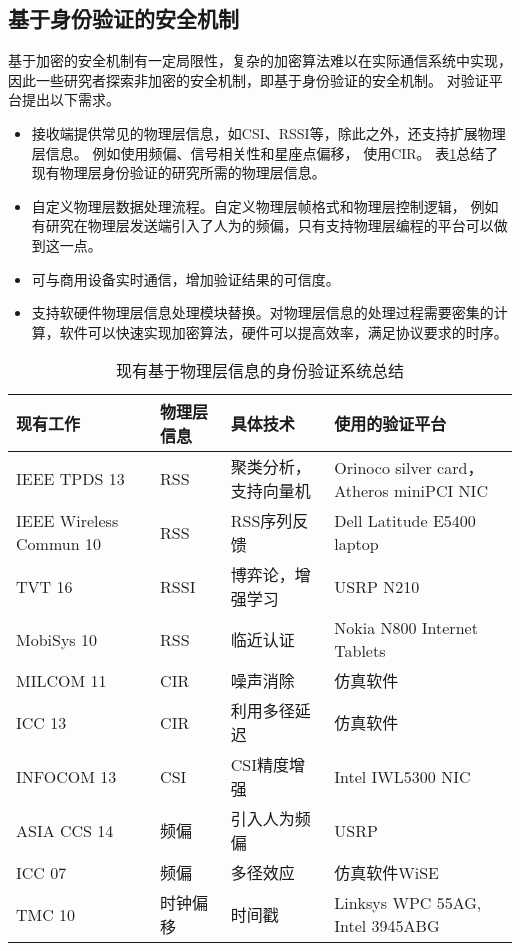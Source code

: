 		\subsection{基于身份验证的安全机制}\label{subsec:demand_identification}
		基于加密的安全机制有一定局限性，复杂的加密算法难以在实际通信系统中实现\cite{ccs16mumimo}，
		因此一些研究者探索非加密的安全机制，即基于身份验证的安全机制\cite{ieeewc10noncryp}。
		对验证平台提出以下需求。
		\begin{itemize}
			\item 接收端提供常见的物理层信息，如CSI、RSSI等，除此之外，还支持扩展物理层信息。
			例如使用频偏、信号相关性和星座点偏移\cite{mobicom08radiometric}，
			使用CIR\cite{milcom11cir}。
			表\ref{tab:phy_auth_summary}总结了现有物理层身份验证的研究所需的物理层信息。
			\item 自定义物理层数据处理流程。自定义物理层帧格式和物理层控制逻辑，
			例如有研究在物理层发送端引入了人为的频偏\cite{asiaccs14csi}，只有支持物理层编程的平台可以做到这一点。
			\item 可与商用设备实时通信，增加验证结果的可信度。
			\item 支持软硬件物理层信息处理模块替换。对物理层信息的处理过程需要密集的计算，软件可以快速实现加密算法，硬件可以提高效率，满足协议要求的时序。
		\end{itemize}
		\begin{table}[!hbp]
		\centering
		\caption{现有基于物理层信息的身份验证系统总结}
		\label{tab:phy_auth_summary}
			\begin{tabular}{|p{0.2\textwidth}|l|p{}|p{}|} \hline
			现有工作 & 物理层信息 & 具体技术 & 使用的验证平台 \\ \hline
			IEEE TPDS 13\cite{tpds13spoofing} & RSS & 聚类分析，支持向量机 & Orinoco silver card，Atheros miniPCI NIC \\ \hline
			IEEE Wireless Commun 10\cite{ieeewc10noncryp} & RSS & RSS序列反馈 & Dell Latitude E5400 laptop \\ \hline
			TVT 16\cite{tvt16spoofing} & RSSI & 博弈论，增强学习 & USRP N210 \\ \hline
			MobiSys 10\cite{mobisys10proximity} & RSS & 临近认证 & Nokia N800 Internet Tablets \\ \hline
			MILCOM 11\cite{milcom11cir} & CIR & 噪声消除 & 仿真软件 \\ \hline
			ICC 13\cite{icc13cir} & CIR & 利用多径延迟 & 仿真软件 \\ \hline
			INFOCOM 13\cite{infocom13csi} & CSI & CSI精度增强 & Intel IWL5300 NIC \\ \hline
			ASIA CCS 14\cite{asiaccs14csi} & 频偏 & 引入人为频偏 & USRP \\ \hline
			ICC 07\cite{icc07xiao} & 频偏 & 多径效应 & 仿真软件WiSE\cite{bell95wise} \\ \hline
			TMC 10\cite{tmc10clock} & 时钟偏移 & 时间戳 & Linksys WPC 55AG, Intel 3945ABG \\ \hline
			\end{tabular}
		\end{table}

